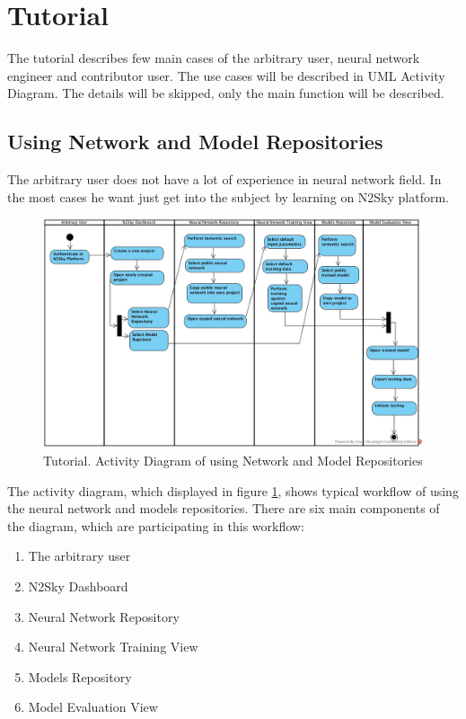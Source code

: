 \section{Tutorial}\label{Tutorial}

The tutorial describes few main cases of the arbitrary user, neural network engineer and contributor user. The use cases will be described in UML  Activity Diagram. The details will be skipped, only the main function will be described.  

\subsection{Using Network and Model Repositories}\label{Using Network and Model Repositories}

The arbitrary user does not have a lot of experience in neural network field. In the most cases he want just get into the subject by learning on N2Sky platform. 

\begin{figure}[htbp]
\begin{center}
  \includegraphics[width=\linewidth]{components/tutorial/img/training_arbitrary.jpg}
  \caption{Tutorial. Activity Diagram of using Network and Model Repositories}
  \label{fig:training_arbitrary}
\end{center}
\end{figure} 

The activity diagram, which displayed in figure \ref{fig:training_arbitrary}, shows typical workflow of using the neural network and models repositories. There are six main components of the diagram, which are participating in this workflow: 
\begin{enumerate}
\item The arbitrary user
\item N2Sky Dashboard
\item Neural Network Repository
\item Neural Network Training View
\item Models Repository
\item Model Evaluation View
\end{enumerate}

